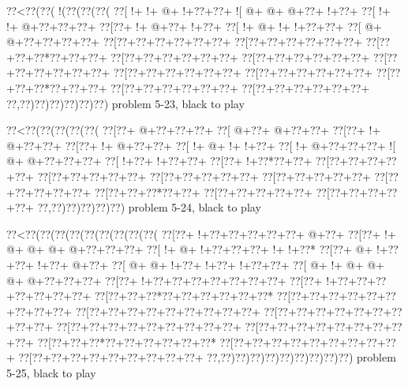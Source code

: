 \vbox{\vbox{\goo
\0??<\0??(\0??(\- !(\0??(\0??(\0??(
\0??[\- !+\- !+\- @+\- !+\0??+\0??+
\- ![\- @+\- @+\- @+\0??+\- !+\0??+
\0??[\- !+\- !+\- @+\0??+\0??+\0??+
\0??[\0??+\- !+\- @+\0??+\- !+\0??+
\0??[\- !+\- @+\- !+\- !+\0??+\0??+
\0??[\- @+\- @+\0??+\0??+\0??+\0??+
\0??[\0??+\0??+\0??+\0??+\0??+\0??+
\0??[\0??+\0??+\0??+\0??+\0??+\0??+
\0??[\0??+\0??+\0??*\0??+\0??+\0??+
\0??[\0??+\0??+\0??+\0??+\0??+\0??+
\0??[\0??+\0??+\0??+\0??+\0??+\0??+
\0??[\0??+\0??+\0??+\0??+\0??+\0??+
\0??[\0??+\0??+\0??+\0??+\0??+\0??+
\0??[\0??+\0??+\0??+\0??+\0??+\0??+
\0??[\0??+\0??+\0??*\0??+\0??+\0??+
\0??[\0??+\0??+\0??+\0??+\0??+\0??+
\0??[\0??+\0??+\0??+\0??+\0??+\0??+
\0??,\0??)\0??)\0??)\0??)\0??)\0??)
}
\hfil problem 5-23, black to play\hfil\break
}

\vbox{\vbox{\goo
\0??<\0??(\0??(\0??(\0??(\0??(
\0??[\0??+\- @+\0??+\0??+\0??+
\0??[\- @+\0??+\- @+\0??+\0??+
\0??[\0??+\- !+\- @+\0??+\0??+
\0??[\0??+\- !+\- @+\0??+\0??+
\0??[\- !+\- @+\- !+\- !+\0??+
\0??[\- !+\- @+\0??+\0??+\0??+
\- ![\- @+\- @+\0??+\0??+\0??+
\0??[\- !+\0??+\- !+\0??+\0??+
\0??[\0??+\- !+\0??*\0??+\0??+
\0??[\0??+\0??+\0??+\0??+\0??+
\0??[\0??+\0??+\0??+\0??+\0??+
\0??[\0??+\0??+\0??+\0??+\0??+
\0??[\0??+\0??+\0??+\0??+\0??+
\0??[\0??+\0??+\0??+\0??+\0??+
\0??[\0??+\0??+\0??*\0??+\0??+
\0??[\0??+\0??+\0??+\0??+\0??+
\0??[\0??+\0??+\0??+\0??+\0??+
\0??,\0??)\0??)\0??)\0??)\0??)
}
\hfil problem 5-24, black to play\hfil\break
}

\vbox{\vbox{\goo
\0??<\0??(\0??(\0??(\0??(\0??(\0??(\0??(\0??(\0??(
\0??[\0??+\- !+\0??+\0??+\0??+\0??+\0??+\- @+\0??+
\0??[\0??+\- !+\- @+\- @+\- @+\- @+\0??+\0??+\0??+
\0??[\- !+\- @+\- !+\0??+\0??+\0??+\- !+\- !+\0??*
\0??[\0??+\- @+\- !+\0??+\0??+\- !+\0??+\- @+\0??+
\0??[\- @+\- @+\- !+\0??+\- !+\0??+\- !+\0??+\0??+
\0??[\- @+\- !+\- @+\- @+\- @+\- @+\0??+\0??+\0??+
\0??[\0??+\- !+\0??+\0??+\0??+\0??+\0??+\0??+\0??+
\0??[\0??+\- !+\0??+\0??+\0??+\0??+\0??+\0??+\0??+
\0??[\0??+\0??+\0??*\0??+\0??+\0??+\0??+\0??+\0??*
\0??[\0??+\0??+\0??+\0??+\0??+\0??+\0??+\0??+\0??+
\0??[\0??+\0??+\0??+\0??+\0??+\0??+\0??+\0??+\0??+
\0??[\0??+\0??+\0??+\0??+\0??+\0??+\0??+\0??+\0??+
\0??[\0??+\0??+\0??+\0??+\0??+\0??+\0??+\0??+\0??+
\0??[\0??+\0??+\0??+\0??+\0??+\0??+\0??+\0??+\0??+
\0??[\0??+\0??+\0??*\0??+\0??+\0??+\0??+\0??+\0??*
\0??[\0??+\0??+\0??+\0??+\0??+\0??+\0??+\0??+\0??+
\0??[\0??+\0??+\0??+\0??+\0??+\0??+\0??+\0??+\0??+
\0??,\0??)\0??)\0??)\0??)\0??)\0??)\0??)\0??)\0??)
}
\hfil problem 5-25, black to play\hfil\break
}

